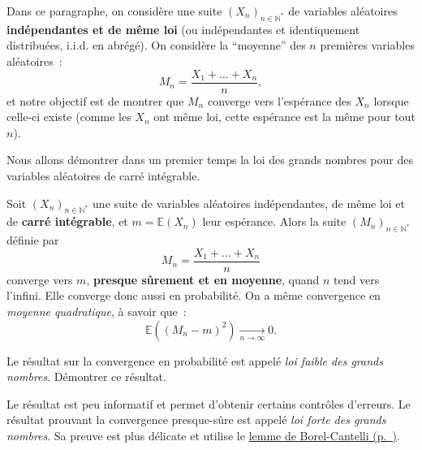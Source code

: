 Dans ce paragraphe, on considère une suite
\((X_n)_{n\in\mathbb{N}^\ast}\) de variables aléatoires
\textbf{indépendantes et de même loi} (ou indépendantes et identiquement
distribuées, i.i.d. en abrégé). On considère la ``moyenne'' des \(n\)
premières variables aléatoires~:
\[ M_n = \frac{X_1 + \ldots + X_n}{n},\] et notre objectif est de
montrer que \(M_n\) converge vers l'espérance des \(X_n\) lorsque
celle-ci existe (comme les \(X_n\) ont même loi, cette espérance est la
même pour tout \(n\)).

Nous allons démontrer dans un premier temps la loi des grands nombres
pour des variables aléatoires de carré intégrable.

\begin{theoreme}\label{IV-loi-des-grands-nombres-cas-mathcall2}

Soit \((X_n)_{n\in\mathbb{N}^\ast}\) une suite de variables aléatoires
indépendantes, de même loi et de \textbf{carré intégrable}, et
\(m = \mathbb{E}(X_n)\) leur espérance. Alors la suite
\((M_n)_{n\in\mathbb{N}^\ast}\) définie par
\[M_n = \frac{X_1 + \ldots + X_n}{n}\] converge vers \(m\),
\textbf{presque sûrement et en moyenne}, quand \(n\) tend vers l'infini.
Elle converge donc aussi en probabilité. On a même convergence en
\emph{moyenne quadratique}, à savoir que~:
\[ \mathbb{E}((M_n - m)^2) \xrightarrow[n \to \infty]{} 0.\]
\end{theoreme}

\label{IV-wlln}
Le résultat sur la convergence en probabilité est appelé \emph{loi
faible des grands nombres}. Démontrer ce
résultat.

Le résultat est peu informatif et permet d'obtenir certains contrôles
d'erreurs. Le résultat prouvant la convergence presque-sûre est appelé
\emph{loi forte des grands nombres}. Sa preuve est plus délicate et
utilise le \protect\hyperref[IV-BC]{lemme de
Borel-Cantelli (p.~\pageref*{IV-BC})}.



